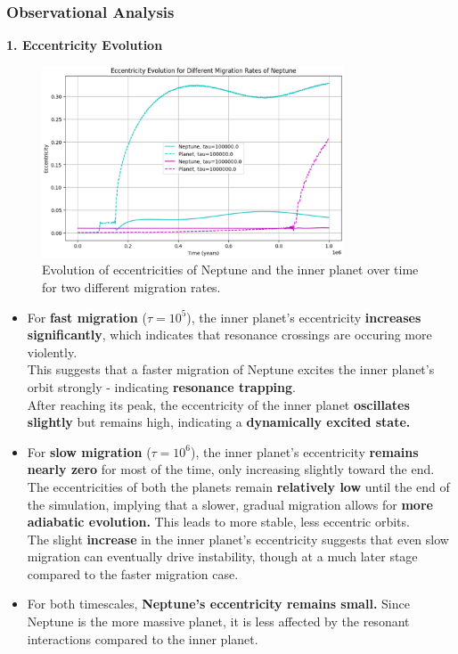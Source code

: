 \documentclass[12pt,a4paper]{article}
\begin{document}
\subsubsection{Observational Analysis}
\textbf{1. Eccentricity Evolution}
\begin{figure}[h]
  \centering
  \includegraphics[width=0.8\textwidth]{ExpoMig/Eccentricity_Evo.png}
  \caption{Evolution of eccentricities of Neptune and the inner planet over time for two different migration rates.}
  \label{fig:eccentricity}
\end{figure}
\begin{itemize}
    \item For \textbf{fast migration} (\(\tau = 10^5\)), the inner planet’s eccentricity \textbf{increases significantly}, which indicates that resonance crossings are occuring more violently. 
    \\ This suggests that a faster migration of Neptune excites the inner planet's orbit strongly - indicating \textbf{resonance trapping}.
    \\ After reaching its peak, the eccentricity of the inner planet \textbf{oscillates slightly} but remains high, indicating a \textbf{dynamically excited state.}
    \item For \textbf{slow migration} (\(\tau = 10^6\)), the inner planet’s eccentricity \textbf{remains nearly zero} for most of the time, only increasing slightly toward the end.
    \\ The eccentricities of both the planets remain \textbf{relatively low} until the end of the simulation, implying that a slower, gradual migration allows for \textbf{more adiabatic evolution.} This leads to more stable, less eccentric orbits.
    \\ The slight \textbf{increase} in the inner planet's eccentricity suggests that even slow migration can eventually drive instability, though at a much later stage compared to the faster migration case.
    \item For both timescales, \textbf{Neptune's eccentricity remains small.} Since Neptune is the more massive planet, it is less affected by the resonant interactions compared to the inner planet.
    
  \end{itemize}
\end{document}
